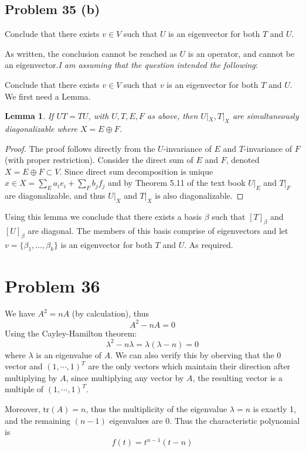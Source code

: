 \documentclass{article}[10pt]
\newtheorem{lem}{Lemma}
\begin{document}
\subsection{Problem 35 (b)}
Conclude that there exists  $v \in V$ such that $U$ is an eigenvector
for both $T$ and $U$.

As written, the conclusion cannot be reached as $U$ is an operator, and cannot
be an eigenvector.{\it I am assuming that the question intended the following}:

Conclude that there exists  $v \in V$ such that $v$ is an eigenvector
for both $T$ and $U$.
We first need a Lemma.
\begin{lem}
If $UT=TU$, with $U,T,E,F$ as above, then $U|_X,T|_X$ are simultaneously diagonalizable where $X=E \oplus F$.
\end{lem}
\begin{proof}
The proof follows directly from the $U$-invariance of $E$ and $T$-invariance
of $F$ (with proper restriction). Consider the direct sum of $E$ and $F$, 
denoted $X=E\oplus F \subset V$. Since direct sum decomposition is unique
$x \in X = \sum_E a_ie_i + \sum_F b_jf_j$ and by Theorem 5.11 of the text
book $U|_E$ and $T|_F$ are diagonalizable, and thus $U|_X$ and $T|_X$ is
also diagonalizable.
\end{proof}
Using this lemma we conclude that there exists a basis $\beta$ such that
$[T]_\beta$ and $[U]_\beta$ are diagonal. The members of this basis comprise
of eigenvectors and let $v=\{\beta_1,\ldots,\beta_k\}$ is an eigenvector
for both $T$ and $U$. As required.

\section{Problem 36}
We have $A^2=nA$ (by calculation), thus
\[
A^2 -nA = 0
\]
Using the Cayley-Hamilton theorem:
\[
\lambda^2 -n\lambda = \lambda(\lambda -n) = 0
\]
where $\lambda$ is an eigenvalue of $A$. We can also verify this
by oberving that the 0 vector and $(1,\cdots,1)^T$ are the only
vectors which maintain their direction after multiplying by $A$, since
multiplying any vector by $A$, the resulting vector is a multiple of
$(1,\cdots,1)^T$. 

Moreover, $\textrm{tr}(A)=n$, thus the multiplicity of the eigenvalue
$\lambda=n$ is exactly 1, and the remaining $(n-1)$ eigenvalues
are 0. Thus the characteristic polynomial is
\[
f(t) = t^{n-1}(t-n)
\]
\end{document}
